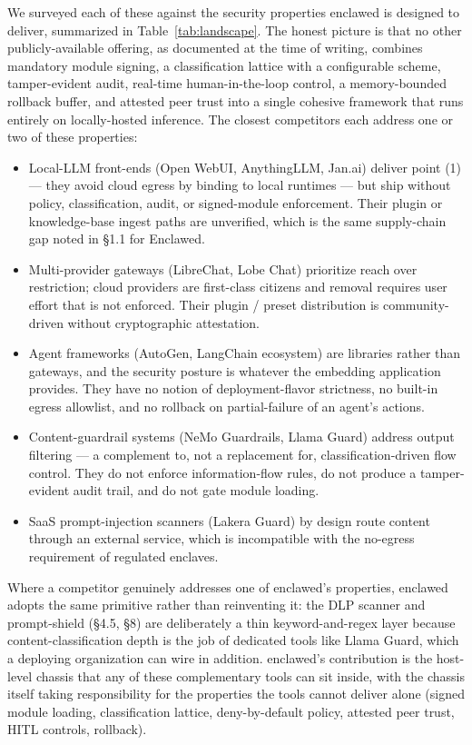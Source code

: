 \documentclass[11pt]{article}
\begin{document}
We surveyed each of these against the security properties enclawed is
designed to deliver, summarized in Table~\ref{tab:landscape}. The
honest picture is that no other publicly-available offering, as
documented at the time of writing, combines mandatory module signing,
a classification lattice with a configurable scheme, tamper-evident
audit, real-time human-in-the-loop control, a memory-bounded rollback
buffer, and attested peer trust into a single cohesive framework that
runs entirely on locally-hosted inference. The closest competitors
each address one or two of these properties:

\begin{itemize}
  \item Local-LLM front-ends (Open WebUI, AnythingLLM, Jan.ai) deliver
    point (1) --- they avoid cloud egress by binding to local runtimes
    --- but ship without policy, classification, audit, or
    signed-module enforcement. Their plugin or knowledge-base ingest
    paths are unverified, which is the same supply-chain gap noted in
    §1.1 for Enclawed.
  \item Multi-provider gateways (LibreChat, Lobe Chat) prioritize
    reach over restriction; cloud providers are first-class citizens
    and removal requires user effort that is not enforced. Their
    plugin / preset distribution is community-driven without
    cryptographic attestation.
  \item Agent frameworks (AutoGen, LangChain ecosystem) are libraries
    rather than gateways, and the security posture is whatever the
    embedding application provides. They have no notion of
    deployment-flavor strictness, no built-in egress allowlist, and
    no rollback on partial-failure of an agent's actions.
  \item Content-guardrail systems (NeMo Guardrails, Llama Guard)
    address output filtering --- a complement to, not a replacement
    for, classification-driven flow control. They do not enforce
    information-flow rules, do not produce a tamper-evident audit
    trail, and do not gate module loading.
  \item SaaS prompt-injection scanners (Lakera Guard) by design route
    content through an external service, which is incompatible with
    the no-egress requirement of regulated enclaves.
\end{itemize}

Where a competitor genuinely addresses one of enclawed's properties,
enclawed adopts the same primitive rather than reinventing it: the DLP
scanner and prompt-shield (§4.5, §8) are deliberately a thin
keyword-and-regex layer because content-classification depth is the
job of dedicated tools like Llama Guard, which a deploying
organization can wire in addition. enclawed's contribution is the
host-level chassis that any of these complementary tools can sit
inside, with the chassis itself taking responsibility for the
properties the tools cannot deliver alone (signed module loading,
classification lattice, deny-by-default policy, attested peer trust,
HITL controls, rollback).
\end{document}

